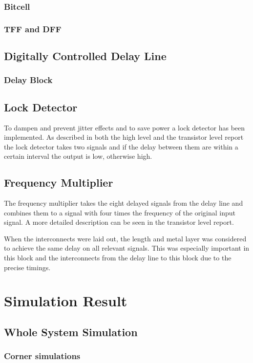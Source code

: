 \documentclass[a4paper,12pt]{article} \usepackage{graphicx}
\begin{document}
\subsubsection{Bitcell}
\subsubsection{TFF and DFF}
\subsection{Digitally Controlled Delay Line}
\subsubsection{Delay Block}
\subsection{Lock Detector}
To dampen and prevent jitter effects and to save power a lock detector
has been implemented. As described in both the high level and the
transistor level report the lock detector takes two signals and if
the delay between them are within a certain interval the output is
low, otherwise high.
\subsection{Frequency Multiplier}
The frequency multiplier takes the eight delayed signals from the delay line and
combines them to a signal with four times the frequency of the original input
signal. A more detailed description can be seen in the transistor level report\cite{transistor}.

When the interconnects were laid out, the length and metal layer was considered
to achieve the same delay on all relevant signals. This was especially important
in this block and the interconnects from the delay line to this block due to
the precise timings. 

\section{Simulation Result}
\subsection{Whole System Simulation}
\subsubsection{Corner simulations}
\end{document}
